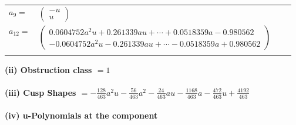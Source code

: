 \documentclass[1p]{elsarticle_modified}
\theoremstyle{definition}
\begin{document}
\begin{tabular}{m{7pt} m{180pt} m{7pt} m{180pt} }
\flushright $a_{9}=$&$\begin{pmatrix}- u\\u\end{pmatrix}$ \\
\flushright $a_{12}=$&$\begin{pmatrix}0.0604752 a^{2} u+0.261339 a u+\cdots+0.0518359 a-0.980562\\-0.0604752 a^{2} u-0.261339 a u+\cdots-0.0518359 a+0.980562\end{pmatrix}$\\&\end{tabular}
\flushleft \textbf{(ii) Obstruction class $= 1$}\\~\\
\flushleft \textbf{(iii) Cusp Shapes $= -\frac{128}{463} a^2 u-\frac{56}{463} a^2-\frac{24}{463} a u-\frac{1168}{463} a-\frac{472}{463} u+\frac{4192}{463}$}\\~\\
\newpage\renewcommand{\arraystretch}{1}
\flushleft \textbf{(iv) u-Polynomials at the component}\newline \\
\end{document}
